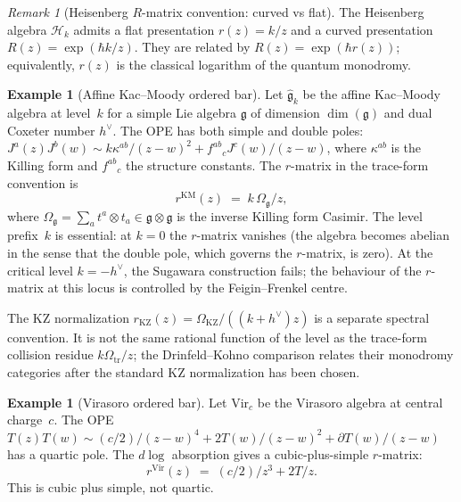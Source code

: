 \documentclass[11pt,reqno]{amsart}
\theoremstyle{definition}
\newtheorem{example}[theorem]{Example}
\theoremstyle{remark}
\newtheorem{remark}[theorem]{Remark}
\newcommand{\cH}{\mathcal{H}}
\newcommand{\fg}{\mathfrak{g}}
\newcommand{\Vir}{\mathrm{Vir}}
\newcommand{\KM}{\mathrm{KM}}
\numberwithin{equation}{section}
\begin{document}
\begin{remark}[Heisenberg $R$-matrix convention: curved vs flat]\label{rem:heis-convention-eone-primacy}
The Heisenberg algebra $\cH_k$ admits a flat presentation
$r(z)=k/z$ and a curved presentation $R(z)=\exp(\hbar k/z)$. They
are related by $R(z)=\exp(\hbar r(z))$; equivalently, $r(z)$ is the
classical logarithm of the quantum monodromy.
\end{remark}

\begin{example}[Affine Kac--Moody ordered bar]
\label{ex:km-bar}
Let $\widehat{\fg}_k$ be the affine Kac--Moody algebra at level~$k$
for a simple Lie algebra $\fg$ of dimension $\dim(\fg)$ and dual
Coxeter number $h^\vee$. The OPE has both simple and double poles:
$J^a(z) J^b(w) \sim k\kappa^{ab}/(z-w)^2 + f^{ab}{}_c J^c(w)/(z-w)$,
where $\kappa^{ab}$ is the Killing form and $f^{ab}{}_c$ the
structure constants. The $r$-matrix in the trace-form convention is
\begin{equation}\label{eq:km-r-matrix}
  r^{\KM}(z) \;=\; k\,\Omega_\fg/z,
\end{equation}
where $\Omega_\fg = \sum_a t^a \otimes t_a \in \fg \otimes \fg$
is the inverse Killing form Casimir. The level prefix~$k$ is
essential: at $k = 0$ the $r$-matrix vanishes (the algebra becomes
abelian in the sense that the double pole, which governs the
$r$-matrix, is zero). At the critical level $k = -h^\vee$, the
Sugawara construction fails; the behaviour of the $r$-matrix at
this locus is controlled by the Feigin--Frenkel centre.

The KZ normalization
$r_{\mathrm{KZ}}(z)=\Omega_{\mathrm{KZ}}/((k+h^\vee)z)$ is a separate
spectral convention. It is not the same rational function of the
level as the trace-form collision residue \(k\Omega_{\mathrm{tr}}/z\);
the Drinfeld--Kohno comparison relates their monodromy categories
after the standard KZ normalization has been chosen.
\end{example}

\begin{example}[Virasoro ordered bar]
\label{ex:vir-bar}
Let $\Vir_c$ be the Virasoro algebra at central charge~$c$. The
OPE $T(z)T(w) \sim (c/2)/(z-w)^4 + 2T(w)/(z-w)^2 + \partial T(w)/(z-w)$
has a quartic pole. The $d\log$ absorption gives a cubic-plus-simple
$r$-matrix:
\begin{equation}\label{eq:vir-r-matrix}
  r^{\Vir}(z) \;=\; (c/2)/z^3 + 2T/z.
\end{equation}
This is cubic plus simple, not quartic.
\end{example}
\end{document}

